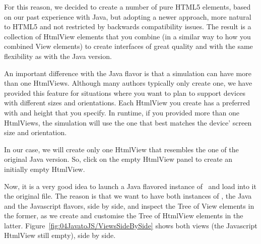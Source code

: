For this reason, we decided to create a number of pure HTML5 elements, based on our past experience with Java, but adopting a newer approach, more natural to HTML5 and not restricted by backwards compatibility issues. The result is a collection of HtmlView elements that you combine (in a similar way to how you combined View elements) to create interfaces of great quality and with the same flexibility as with the Java version.

An important difference with the Java flavor is that a simulation can have more than one HtmlViews. Although many authors typically only create one, we have provided this feature for situations where you want to plan to support devices with different sizes and orientations. Each HtmlView you create has a preferred with and height that you specify. In runtime, if you provided more than one HtmlViews, the simulation will use the one that best matches the device' screen size and orientation.

In our case, we will create only one HtmlView that resembles the one of the original Java version. So, click on the empty HtmlView panel to create an initially empty HtmlView. 

Now, it is a very good idea to launch a Java flavored instance of \ejs\ and load into it the original  file. The reason is that we want to have both instances of \ejs, the Java and the Javascript flavors, side by side, and inspect the Tree of View elements in the former, as we create and customise the Tree of HtmlView elements in the latter. Figure~\ref{fig:04JavatoJS/ViewsSideBySide} shows both views (the Javascript HtmlView still empty), side by side. 


